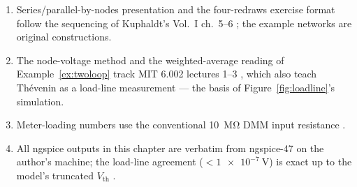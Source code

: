 \chapternotes
\begin{enumerate}
\item Series/parallel-by-nodes presentation and the four-redraws exercise
format follow the sequencing of Kuphaldt's Vol.~I ch.~5--6 \cite{aacvol1};
the example networks are original constructions.
\item The node-voltage method and the weighted-average reading of
Example~\ref{ex:twoloop} track MIT 6.002 lectures 1--3 \cite{ocw6002}, which
also teach Th\'evenin as a load-line measurement — the basis of
Figure~\ref{fig:loadline}'s simulation.
\item Meter-loading numbers use the conventional \qty{10}{\mega\ohm} DMM
input resistance \cite{sparkfunmultimeter}.
\item All ngspice outputs in this chapter are verbatim from ngspice-47 on the
author's machine; the load-line agreement ($<\qty{1e-7}{\volt}$) is exact up
to the model's truncated $V_{\mathrm{th}}$ \cite{ngspice}.
\end{enumerate}
